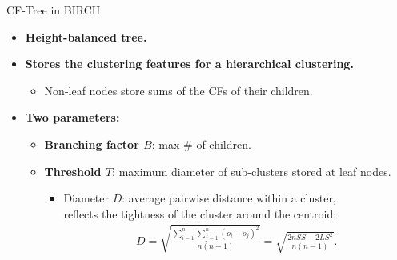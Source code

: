 \begin{frame}{CF-Tree in BIRCH}
	\begin{itemize}
		\item \textbf{Height-balanced tree.}
		\item \textbf{Stores the clustering features for a hierarchical
			      clustering.}
		      \begin{itemize}
			      \item Non-leaf nodes store sums of the CFs of their children.
		      \end{itemize}
		\item \textbf{Two parameters:}
		      \begin{itemize}
			      \item \textbf{\color{airforceblue}Branching factor $B$}: max \# of
			            children.
			      \item \textbf{\color{airforceblue}Threshold $T$}: maximum diameter
			            of sub-clusters stored at leaf nodes.

			            \begin{itemize}

				            \item Diameter $D$: average pairwise distance within a cluster, \\
				                  reflects the tightness of the cluster around the centroid:
				                  \begin{align*}
					                  D = \sqrt{\frac{\sum_{i=1}^{n} \sum_{j=1}^{n}
							                  (o_i-o_j)^2}{n(n-1)}} = \sqrt{\frac{2nSS - 2LS^2}{n(n-1)}}.
				                  \end{align*}

			            \end{itemize}

		      \end{itemize}
	\end{itemize}
\end{frame}

